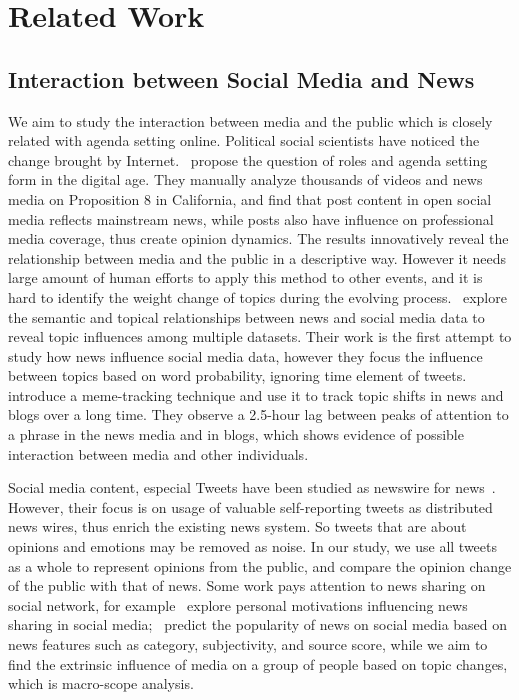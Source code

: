 \section{Related Work}
\label{sec:related_work}

\subsection{Interaction between Social Media and News}
\label{subsec:interaction}
We aim to study the interaction between media and the public which is closely related with agenda setting online. Political social scientists have noticed the change brought by Internet.~ propose the question of roles and agenda setting form in the digital age. They manually analyze thousands of videos and news media on Proposition 8 in California, and find that post content in open social media reflects mainstream news, while posts also have influence on professional media coverage, thus create opinion dynamics. The results innovatively reveal the relationship between media and the public in a descriptive way. However it needs large amount of human efforts to apply this method to other events, and it is hard to identify the weight change of topics during the evolving process.~ explore the semantic and topical relationships between news and social media data to reveal topic influences among multiple datasets. Their work is the first attempt to study how news influence social media data, however they focus the influence between topics based on word probability, ignoring time element of tweets.~ introduce a meme-tracking technique and use it to track topic shifts in news and blogs over a long time. They observe a 2.5-hour lag between peaks of attention to a phrase in the news media and in blogs, which shows evidence of possible interaction between media and other individuals.

Social media content, especial Tweets have been studied as newswire for news~\cite{macdonald2013can,subavsic2011peddling,sankaranarayanan2009twitterstand}. However, their focus is on usage of valuable self-reporting tweets as distributed news wires, thus enrich the existing news system. So tweets that are about opinions and emotions may be removed as noise. In our study, we use all tweets as a whole to represent opinions from the public, and compare the opinion change of the public with that of news.
Some work pays attention to news sharing on social network, for example~ explore personal motivations influencing news sharing in social media;~ predict the popularity of news on social media based on news features such as category, subjectivity, and source score, while we aim to find the extrinsic influence of media on a group of people based on topic changes, which is macro-scope analysis.

